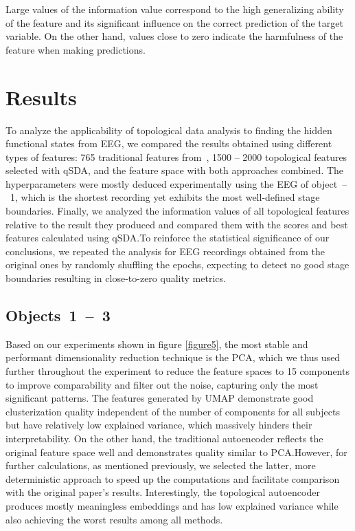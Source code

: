 \documentclass[10pt,lettersize,journal]{IEEEtran}
\begin{document}
Large values of the information value correspond to the high generalizing ability of the feature and its significant influence on the correct prediction of the target variable. On the other hand, values close to zero indicate the harmfulness of the feature when making predictions.

\section{Results}

To analyze the applicability of topological data analysis to finding the hidden functional states from EEG, we compared the results obtained using different types of features: 765 traditional features from~\cite{SDA}, 1500 -- 2000 topological features selected with qSDA, and the feature space with both approaches combined. The hyperparameters were mostly deduced experimentally using the EEG of object~\mbox{--}~1, which is the shortest recording yet exhibits the most well-defined stage boundaries. Finally, we analyzed the information values of all topological features relative to the result they produced and compared them with the scores and best features calculated using qSDA.\@ To reinforce the statistical significance of our conclusions, we repeated the analysis for EEG recordings obtained from the original ones by randomly shuffling the epochs, expecting to detect no good stage boundaries resulting in close-to-zero quality metrics.

\subsection{Objects~1~\mbox{--}~3}

Based on our experiments shown in figure \ref{figure5}, the most stable and performant dimensionality reduction technique is the PCA, which we thus used further throughout the experiment to reduce the feature spaces to 15 components  to improve comparability and filter out the noise, capturing only the most significant patterns. The features generated by UMAP demonstrate good clusterization quality independent of the number of components for all subjects but have relatively low explained variance, which massively hinders their interpretability. On the other hand, the traditional autoencoder reflects the original feature space well and demonstrates quality similar to PCA.\@ However, for further calculations, as mentioned previously, we selected the latter, more deterministic approach to speed up the computations and facilitate comparison with the original paper's results. Interestingly, the topological autoencoder produces mostly meaningless embeddings and has low explained variance while also achieving the worst results among all methods. 
\end{document}

